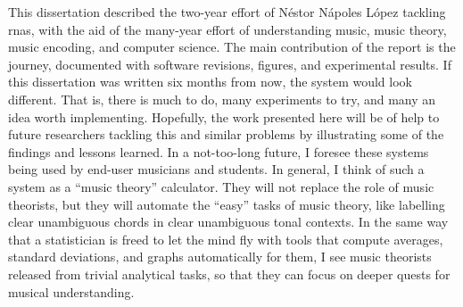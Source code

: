 
This dissertation described the two-year effort of N\'estor
N\'apoles L\'opez tackling \glspl{rna}, with the aid of the
many-year effort of understanding music, music theory, music
encoding, and computer science. The main contribution of the
report is the journey, documented with software revisions,
figures, and experimental results. If this dissertation was
written six months from now, the system would look
different. That is, there is much to do, many experiments to
try, and many an idea worth implementing. Hopefully, the
work presented here will be of help to future researchers
tackling this and similar problems by illustrating some of
the findings and lessons learned. In a not-too-long future,
I foresee these systems being used by end-user musicians and
students. In general, I think of such a system as a ``music
theory'' calculator. They will not replace the role of music
theorists, but they will automate the ``easy'' tasks of
music theory, like labelling clear unambiguous chords in
clear unambiguous tonal contexts. In the same way that a
statistician is freed to let the mind fly with tools that
compute averages, standard deviations, and graphs
automatically for them, I see music theorists released from
trivial analytical tasks, so that they can focus on deeper
quests for musical understanding.
